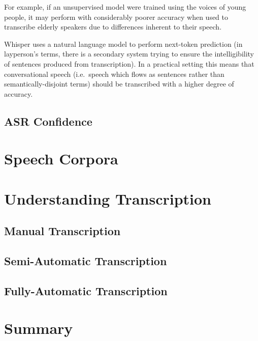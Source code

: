 For example, if an unsupervised model were trained using the voices of young people, it may perform with considerably poorer accuracy when used to transcribe elderly speakers due to differences inherent to their speech\cite{Horton2010}.

Whisper uses a natural language model to perform next-token prediction (in layperson's terms, there is a secondary system trying to ensure the intelligibility of sentences produced from transcription).
In a practical setting this means that conversational speech (i.e.\ speech which flows as sentences rather than semantically-disjoint terms) should be transcribed with a higher degree of accuracy.

\subsection{ASR Confidence}

\section{Speech Corpora}\label{sec:}

\section{Understanding Transcription}\label{sec:transcription}

\subsection{Manual Transcription}\label{subsec:manual-transcription}

\subsection{Semi-Automatic Transcription}\label{subsec:semi-auto-transcription}

\subsection{Fully-Automatic Transcription}\label{subsec:full-auto-transcription}

\section{Summary}\label{sec:lit-survey-summary}
